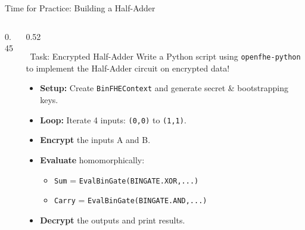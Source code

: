\documentclass[aspectratio=169, 10pt]{beamer}
\begin{document}
\begin{frame}{Time for Practice: Building a Half-Adder}
\begin{columns}[T]
\begin{column}{0.45\textwidth}
\begin{center}
{\begin{tikzpicture}
    \end{tikzpicture}
    }
    \end{center}
\end{column}

\begin{column}{0.52\textwidth}
    \begin{block}{\faKeyboard \ Task: Encrypted Half-Adder}
        \small %
        Write a Python script using \texttt{openfhe-python} to implement the Half-Adder circuit on encrypted data!
        \vspace{0.1cm}
        \begin{itemize}
            \setlength{\itemsep}{0.05cm} %
            \item[\textbf{1.}] \textbf{Setup:} Create \texttt{BinFHEContext} and generate secret \& bootstrapping keys.
            \item[\textbf{2.}] \textbf{Loop:} Iterate 4 inputs: \texttt{(0,0)} to \texttt{(1,1)}.
            \item[\textbf{3.}] \textbf{Encrypt} the inputs A and B.
            \item[\textbf{4.}] \textbf{Evaluate} homomorphically:
            \begin{itemize}
                \setlength{\itemsep}{0cm}
                \item \texttt{Sum} = \texttt{EvalBinGate(BINGATE.XOR,...)}
                \item \texttt{Carry} = \texttt{EvalBinGate(BINGATE.AND,...)}
            \end{itemize}
            \item[\textbf{5.}] \textbf{Decrypt} the outputs and print results.
        \end{itemize}
    \end{block}
\end{column}

\end{columns}
\end{frame}
\end{document}
